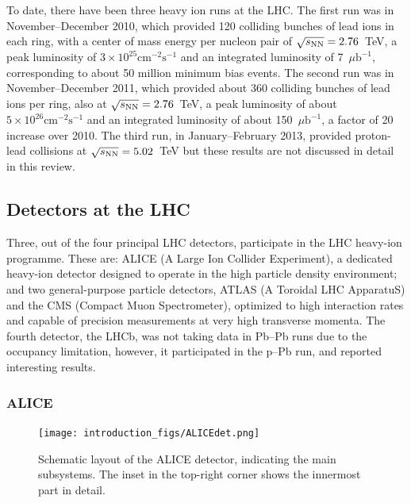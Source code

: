 To date, there have been three heavy ion runs at the LHC.
The first run was in November--December 2010,
which provided 120 colliding bunches of lead ions in each ring, with a center of mass energy per nucleon
pair of $\mbox{$\sqrt{s_{\mathrm{NN}}}$} =2.76$~TeV, a peak luminosity of $3 \times 10^{25} \mathrm{cm}^{-2} \mathrm{s}^{-1}$ and an integrated luminosity
of 7~$\mu \mathrm{b}^{-1}$, corresponding to about 50 million minimum bias events.
The second run was in November--December 2011, which provided about 360 colliding bunches of lead ions per ring,
also at $\mbox{$\sqrt{s_{\mathrm{NN}}}$} =2.76$~TeV, a peak luminosity of
about $5 \times 10^{26} \mathrm{cm}^{-2} \mathrm{s}^{-1}$ and an integrated luminosity of
about 150~$\mu \mathrm{b}^{-1}$, a factor of 20 increase over 2010.
The third run, in January--February 2013, provided proton-lead collisions
at $\mbox{$\sqrt{s_{\mathrm{NN}}}$}=5.02$~TeV but these results are not discussed
in detail in this review.

\subsection{Detectors at the LHC}
\label{subsecall:detectors}

Three, out of the four principal LHC detectors, participate in the LHC heavy-ion programme. These are: ALICE (A Large Ion Collider Experiment), a dedicated heavy-ion detector designed to operate in the high particle density environment; and two general-purpose particle detectors, ATLAS (A Toroidal LHC ApparatuS) and the CMS (Compact Muon Spectrometer), optimized to high interaction rates and capable of precision measurements at very high transverse momenta. The fourth detector, the LHCb, was not taking data in Pb--Pb runs due to the occupancy limitation, however, it participated in the p--Pb run, and reported interesting results.

\subsubsection{ALICE}

\begin{figure}[!t]
\begin{center}
\texttt{[image: introduction\_figs/ALICEdet.png]}
\caption{Schematic layout of the ALICE detector, indicating the main subsystems. The inset in the top-right corner shows the innermost part in detail.}
\label{figks:ALICEdet}
\end{center}
\end{figure}



